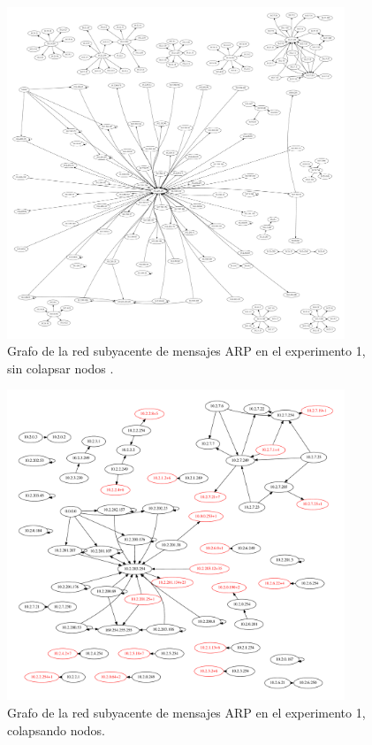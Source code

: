 \begin{figure}[ht]
    \centering
    \includegraphics[width=0.9\textwidth]{figuras/ciudad_10_grafoSinColapsar.pdf}
    \caption{Grafo de la red subyacente de mensajes ARP en el experimento 1, sin colapsar nodos .}\label{ARPDC-sinColapsar}
\end{figure}

\begin{figure}[ht]
    \centering
    \includegraphics[width=0.9\textwidth]{figuras/ciudad_10_grafo.pdf}
    \caption{Grafo de la red subyacente de mensajes ARP en el experimento 1, colapsando nodos.}\label{ARPDC}
\end{figure}

